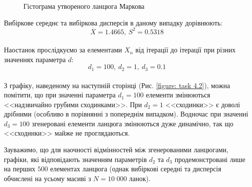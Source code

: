 \documentclass[a4paper,14pt]{extarticle} %
\numberwithin{equation}{section}
\begin{document}
\begin{figure}[H]
    \caption{Гістограма утвореного ланцюга Маркова}
    \label{figure: task 4.1}
\end{figure}

Вибіркове середнє та вибіркова дисперсія в даному випадку дорівнюють: \\

\[ \overline{X}=1.4665, \ S^2=0.5318 \] \\

Наостанок прослідкуємо за елементами $X_n$ від ітерації до ітерації при різних значеннях параметра $d:$ \\

\[ d_1=100,\ d_2=1,\ d_3=0.1 \] \\

З графіку, наведеному на наступній сторінці (Рис. \ref{figure: task 4.2}), можна помітити, що при значенні параметра $d_1=100$ елементи змінюються <<надзвичайно грубими сходинками>>. При $d_2=1$ <<сходинки>> є доволі дрібними (особливо в порівнянні з попереднім випадком). Водночас при значенні $d_3=100$ згенеровані елементи ланцюга змінюються дуже динамічно, так що <<сходинки>> майже не проглядаються.

Зауважимо, що для наочності відмінностей між згенерованими ланцюгами, графіки, які відповідають значенням параметрів $d_2$ та $d_3$ продемонстровані лише на перших $500$ елементах ланцюга (однак вибіркові середні та дисперсія обчислені на усьому масиві з $N=10\;000$ ланок).
\end{document}
